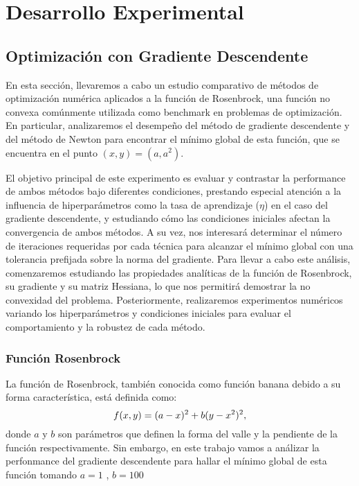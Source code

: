 \documentclass{tp02}
\begin{document}
\section{Desarrollo Experimental}

\subsection{Optimización con Gradiente Descendente}

En esta sección, llevaremos a cabo un estudio comparativo de métodos de optimización numérica
aplicados a la función de Rosenbrock, una función no convexa comúnmente utilizada como
benchmark en problemas de optimización. En particular, analizaremos el desempeño del método
de gradiente descendente y del método de Newton para encontrar el mínimo global de esta
función, que se encuentra en el punto $(x,y)=(a,a^2)$.

El objetivo principal de este experimento es evaluar y contrastar la performance de ambos
métodos bajo diferentes condiciones, prestando especial atención a la influencia de
hiperparámetros como la tasa de aprendizaje ($\eta$) en el caso del gradiente descendente,
y estudiando cómo las condiciones iniciales afectan la convergencia de ambos métodos. A su
vez, nos interesará determinar el número de iteraciones requeridas por cada técnica para
alcanzar el mínimo global con una tolerancia prefijada sobre la norma del gradiente.
Para llevar a cabo este análisis, comenzaremos estudiando las propiedades analíticas de la
función de Rosenbrock, su gradiente y su matriz Hessiana, lo que nos permitirá demostrar
la no convexidad del problema. Posteriormente, realizaremos experimentos numéricos
variando los hiperparámetros y condiciones iniciales para evaluar el comportamiento y
la robustez de cada método.

\subsubsection{Función Rosenbrock}

La función de Rosenbrock, también conocida como función banana debido a su forma característica, 
está definida como:
\begin{equation}
    \centering
    f(x,y) = (a-x)^2 + b(y-x^2)^2, \label{rosenbrock}
\end{equation}
donde $a$ y $b$ son parámetros que definen la forma del valle y la pendiente de la función respectivamente.
Sin embargo, en este trabajo vamos a análizar la perfonmance del gradiente
descendente para hallar el mínimo global de esta función tomando 
$a=1$ , $b=100$\\
\end{document}
